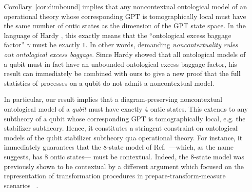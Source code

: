 \documentclass[10pt,twocolumn,aps,groupedaddress,nofootinbib]{revtex4}
\newcommand{\rob}{\color{cyan}}
\newcommand{\blk}{\color{black}}
\begin{document}
 Corollary~\ref{cor:dimbound} implies that any noncontextual ontological model of an operational theory whose corresponding GPT is tomographically local must have the same number of ontic states as the dimension of the GPT state space. In the language of Hardy \cite{Hardy2004}, this exactly means that the ``ontological excess baggage factor'' $\gamma$ must be exactly $1$.  In other words, demanding {\em  noncontextuality rules out ontological excess baggage}. Since Hardy showed that all ontological models of a qubit must in fact have an unbounded ontological excess baggage factor, his result can immediately be combined with ours to give a new proof that the full statistics of processes on a qubit do not admit a noncontextual model.

In particular, our result implies that a diagram-preserving noncontextual ontological model of a {\em qubit} must have exactly $4$ ontic states. This extends to 
any subtheory of a qubit whose corresponding GPT is tomographically local, e.g. the stabilizer subtheory. Hence, it constitutes a stringent constraint on ontological models of the qubit stabilizer subtheory qua operational theory. 
For instance, it immediately guarantees that the $8$-state model of Ref.~\cite{8state}---which, as the name suggests, has 8 ontic states---
must be contextual.   Indeed, the $8$-state model was previously shown to be contextual by a different argument which focused on the representation of transformation procedures in prepare-transform-measure scenarios
~\cite{lillystone2019single}.

\end{document}
